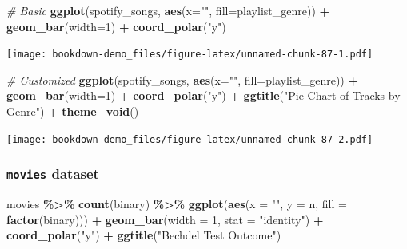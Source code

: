 \documentclass[
  b5paper]{book}
\newenvironment{Shaded}{\begin{snugshade}}{\end{snugshade}}
\newcommand{\AttributeTok}[1]{\textcolor[rgb]{0.13,0.29,0.53}{#1}}
\newcommand{\CommentTok}[1]{\textcolor[rgb]{0.56,0.35,0.01}{\textit{#1}}}
\newcommand{\DecValTok}[1]{\textcolor[rgb]{0.00,0.00,0.81}{#1}}
\newcommand{\FunctionTok}[1]{\textcolor[rgb]{0.13,0.29,0.53}{\textbf{#1}}}
\newcommand{\NormalTok}[1]{#1}
\newcommand{\SpecialCharTok}[1]{\textcolor[rgb]{0.81,0.36,0.00}{\textbf{#1}}}
\newcommand{\StringTok}[1]{\textcolor[rgb]{0.31,0.60,0.02}{#1}}
\begin{document}
\begin{Shaded}
\begin{Highlighting}[]
\CommentTok{\# Basic}
\FunctionTok{ggplot}\NormalTok{(spotify\_songs, }\FunctionTok{aes}\NormalTok{(}\AttributeTok{x=}\StringTok{""}\NormalTok{, }\AttributeTok{fill=}\NormalTok{playlist\_genre)) }\SpecialCharTok{+} \FunctionTok{geom\_bar}\NormalTok{(}\AttributeTok{width=}\DecValTok{1}\NormalTok{) }\SpecialCharTok{+} \FunctionTok{coord\_polar}\NormalTok{(}\StringTok{"y"}\NormalTok{)}
\end{Highlighting}
\end{Shaded}

\texttt{[image: bookdown-demo\_files/figure-latex/unnamed-chunk-87-1.pdf]}

\begin{Shaded}
\begin{Highlighting}[]
\CommentTok{\# Customized}
\FunctionTok{ggplot}\NormalTok{(spotify\_songs, }\FunctionTok{aes}\NormalTok{(}\AttributeTok{x=}\StringTok{""}\NormalTok{, }\AttributeTok{fill=}\NormalTok{playlist\_genre)) }\SpecialCharTok{+} 
  \FunctionTok{geom\_bar}\NormalTok{(}\AttributeTok{width=}\DecValTok{1}\NormalTok{) }\SpecialCharTok{+}
  \FunctionTok{coord\_polar}\NormalTok{(}\StringTok{"y"}\NormalTok{) }\SpecialCharTok{+}
  \FunctionTok{ggtitle}\NormalTok{(}\StringTok{"Pie Chart of Tracks by Genre"}\NormalTok{) }\SpecialCharTok{+}
  \FunctionTok{theme\_void}\NormalTok{()}
\end{Highlighting}
\end{Shaded}

\texttt{[image: bookdown-demo\_files/figure-latex/unnamed-chunk-87-2.pdf]}

\hypertarget{movies-dataset-4}{%
\subsubsection*{\texorpdfstring{\texttt{movies} dataset}{movies dataset}}\label{movies-dataset-4}}

\begin{Shaded}
\begin{Highlighting}[]
\NormalTok{movies }\SpecialCharTok{\%\textgreater{}\%}
  \FunctionTok{count}\NormalTok{(binary) }\SpecialCharTok{\%\textgreater{}\%}
  \FunctionTok{ggplot}\NormalTok{(}\FunctionTok{aes}\NormalTok{(}\AttributeTok{x =} \StringTok{""}\NormalTok{, }\AttributeTok{y =}\NormalTok{ n, }\AttributeTok{fill =} \FunctionTok{factor}\NormalTok{(binary))) }\SpecialCharTok{+}
  \FunctionTok{geom\_bar}\NormalTok{(}\AttributeTok{width =} \DecValTok{1}\NormalTok{, }\AttributeTok{stat =} \StringTok{"identity"}\NormalTok{) }\SpecialCharTok{+}
  \FunctionTok{coord\_polar}\NormalTok{(}\StringTok{"y"}\NormalTok{) }\SpecialCharTok{+}
  \FunctionTok{ggtitle}\NormalTok{(}\StringTok{"Bechdel Test Outcome"}\NormalTok{)}
\end{Highlighting}
\end{Shaded}
\end{document}
